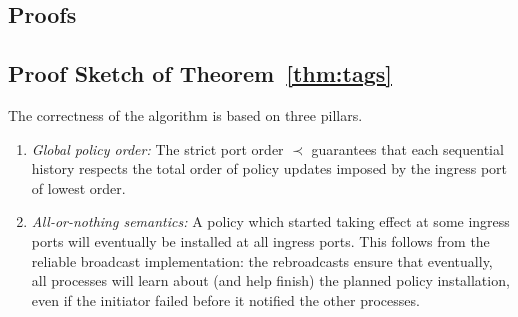 \documentclass[11pt,pdftex,letter]{article}
\newcommand{\eg}{{\it e.g.}}
\newcommand{\ssnote}[1]{\textcolor{heraldBlue}{\small \bf [SS: #1]}}
\newcommand{\ssnote}[1]{}
\begin{document}
\begin{appendix}

\section{Proofs}


\subsection{Proof Sketch of Theorem~\ref{thm:tags}}

The correctness of the algorithm is based on three pillars.

\begin{enumerate}
\item \emph{Global policy order:} The strict port order $\prec$ guarantees that each sequential
history respects the total order of policy updates imposed by the ingress port of
lowest order. 

\item \emph{All-or-nothing semantics:} A policy which started taking effect at some ingress ports will eventually 
be installed at all ingress ports. This follows from the reliable broadcast implementation: the rebroadcasts ensure
that eventually, all processes will learn about (and help finish) the planned policy installation, even if the initiator failed before it
notified the other processes. 


\end{enumerate}
\end{appendix}
\end{document}
